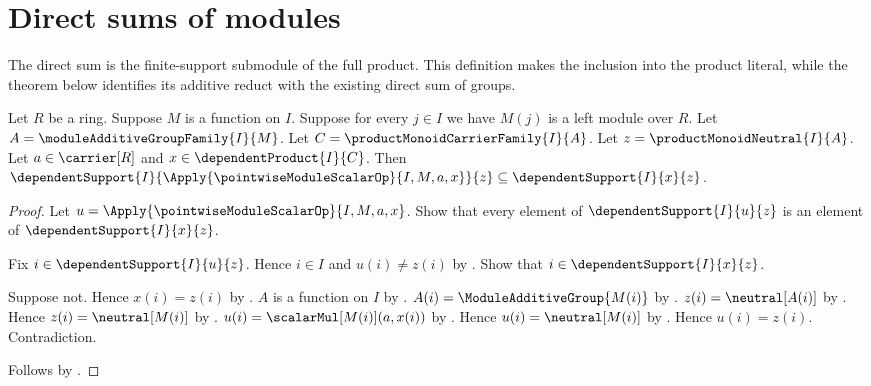 


\section{Direct sums of modules}

The direct sum is the finite-support submodule of the full product.  This
definition makes the inclusion into the product literal, while the theorem
below identifies its additive reduct with the existing direct sum of groups.

\begin{proposition}\label{pointwise_module_scalar_support}
    Let $R$ be a ring.
    Suppose $M$ is a function on $I$.
    Suppose for every $j\in I$ we have $M(j)$ is a left module over $R$.
    Let $A=\moduleAdditiveGroupFamily{I}{M}$.
    Let $C=\productMonoidCarrierFamily{I}{A}$.
    Let $z=\productMonoidNeutral{I}{A}$.
    Let $a\in\carrier[R]$ and $x\in\dependentProduct{I}{C}$.
    Then
        $\dependentSupport{I}{
            \Apply{\pointwiseModuleScalarOp}{I,M,a,x}}{z}
        \subseteq\dependentSupport{I}{x}{z}$.
\end{proposition}
\begin{proof}
    Let $u=\Apply{\pointwiseModuleScalarOp}{I,M,a,x}$.
    Show that every element of $\dependentSupport{I}{u}{z}$
        is an element of $\dependentSupport{I}{x}{z}$.
    \begin{subproof}
        Fix $i\in\dependentSupport{I}{u}{z}$.
        Hence $i\in I$ and $u(i)\neq z(i)$ by
            .
        Show that $i\in\dependentSupport{I}{x}{z}$.
        \begin{subproof}
            Suppose not.
            Hence $x(i)=z(i)$ by .
            $A$ is a function on $I$ by
                .
            $A(i)=\ModuleAdditiveGroup{M(i)}$ by
                .
            $z(i)=\neutral[A(i)]$ by
                .
            Hence $z(i)=\neutral[M(i)]$ by
                .
            $u(i)=\scalarMul[M(i)](a,x(i))$ by
                .
            Hence $u(i)=\neutral[M(i)]$ by
                .
            Hence $u(i)=z(i)$.
            Contradiction.
        \end{subproof}
    \end{subproof}
    Follows by .
\end{proof}

